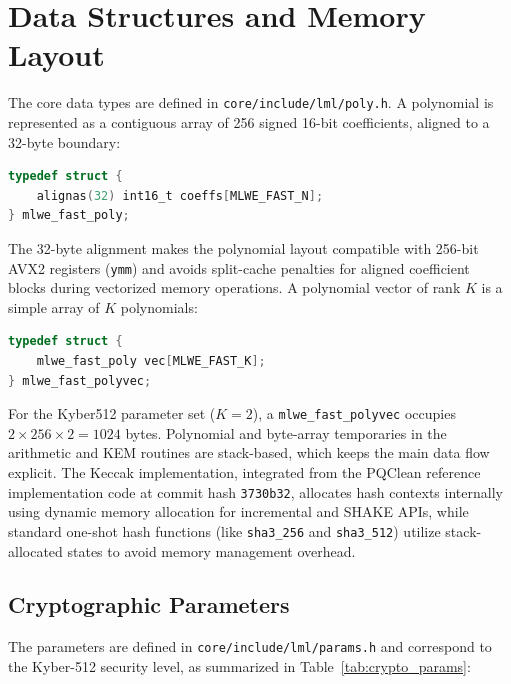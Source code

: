 \section{Data Structures and Memory Layout}
\label{sec:data_structures}

The core data types are defined in \texttt{core/include/lml/poly.h}. A polynomial is represented as a contiguous array of 256 signed 16-bit coefficients, aligned to a 32-byte boundary:

\begin{lstlisting}[language=C]
typedef struct {
    alignas(32) int16_t coeffs[MLWE_FAST_N];
} mlwe_fast_poly;
\end{lstlisting}

The 32-byte alignment makes the polynomial layout compatible with 256-bit AVX2 registers (\texttt{ymm}) and avoids split-cache penalties for aligned coefficient blocks during vectorized memory operations. A polynomial vector of rank $K$ is a simple array of $K$ polynomials:

\begin{lstlisting}[language=C]
typedef struct {
    mlwe_fast_poly vec[MLWE_FAST_K];
} mlwe_fast_polyvec;
\end{lstlisting}

For the Kyber512 parameter set ($K=2$), a \texttt{mlwe\_fast\_polyvec} occupies $2 \times 256 \times 2 = 1024$ bytes. Polynomial and byte-array temporaries in the arithmetic and KEM routines are stack-based, which keeps the main data flow explicit. The Keccak implementation, integrated from the PQClean reference implementation code at commit hash \texttt{3730b32}, allocates hash contexts internally using dynamic memory allocation for incremental and SHAKE APIs, while standard one-shot hash functions (like \texttt{sha3\_256} and \texttt{sha3\_512}) utilize stack-allocated states to avoid memory management overhead.

\subsection{Cryptographic Parameters}
\label{sub:cryptographic_params}

The parameters are defined in \texttt{core/\allowbreak include/\allowbreak lml/\allowbreak params.h} and correspond to the Kyber-512 security level, as summarized in Table~\ref{tab:crypto_params}:

